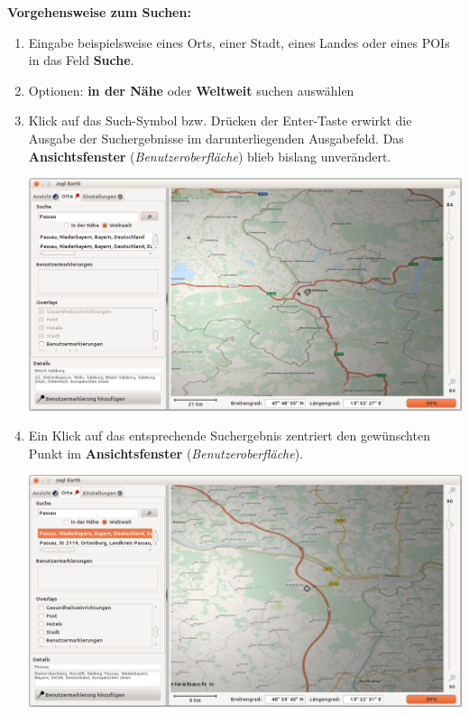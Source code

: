 \documentclass[10pt]{scrreprt}
\newcommand{\textref}[1]{\mbox{\raisebox{0.1ex}{\small$\rightarrow$ }\textit{#1}}}
\begin{document}
\newpage
\textbf{Vorgehensweise zum Suchen:}
\begin{enumerate}
\item Eingabe beispielsweise eines Orts, einer Stadt, eines Landes oder eines POIs in das Feld \textbf{Suche}.
\item Optionen: \textbf{in der Nähe} oder \textbf{Weltweit} suchen auswählen
\item Klick auf das Such-Symbol bzw. Drücken der Enter-Taste erwirkt die Ausgabe der Suchergebnisse im darunterliegenden Ausgabefeld. Das \textbf{Ansichtsfenster} (\textref{Benutzeroberfläche}) blieb bislang unverändert.
	\vspace{2mm}
	\begin{center}
	\includegraphics[scale=0.25]{images/flacheKarte_suche1.png}
	\end{center}
\item Ein Klick auf das entsprechende Suchergebnis zentriert den gewünschten Punkt im \textbf{Ansichtsfenster} (\textref{Benutzeroberfläche}).
	\vspace{2mm}
	\begin{center}
	\includegraphics[scale=0.25]{images/flacheKarte_suche2.png}
	\end{center}

\end{enumerate}
\end{document}
